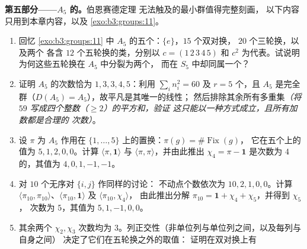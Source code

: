 \begin{problem}
\medskip
\noindent\textbf{第五部分——$A_5$ 的。}伯恩赛德定理
       无法触及的最小群值得完整刻画，
       以下内容只用到本章内容，以及
       \cref{exo:b3:groups:11}。
\begin{enumerate}[resume]
  \item 回忆 \cref{exo:b3:groups:11} 中
        $A_5$ 的五个：$\{e\}$，$15$ 个双对换，
        $20$ 个三轮换，以及两个
        各含 $12$ 个五轮换的类，分别以 $c =
        (1\,2\,3\,4\,5)$ 和 $c^2$ 为代表。试说明
        为何这些五轮换在 $A_5$ 中分裂为两个，
        而在 $S_5$ 中却同属一个？
  \item 证明 $A_5$ 的次数恰为
        $1, 3, 3, 4, 5$：利用 $\sum_in_i^2 = 60$ 及 $r = 5$
        个，且 $A_5$ 是完全群（$D(A_5) =
        A_5$），故平凡是其唯一的线性；
        然后排除其余所有多重集\emph{（将 $59$
        写成四个整数（$\geq 2$）的平方和，验证
        这只能以一种方式成立，且所有加数都是合理的
        次数）}。
  \item 设 $\pi$ 为 $A_5$ 作用在
        $\{1, \dots, 5\}$ 上的置换：$\pi(g) = \#\operatorname{Fix}(g)$，
        它在五个上的值为 $5, 1, 2, 0, 0$。计算
        $\langle\pi, \mathbf 1\rangle$ 与 $\langle\pi,
        \pi\rangle$，并由此推出 $\chi_4 = \pi - \mathbf 1$
        是次数为 $4$ 的，其值为 $4, 0, 1, -1,
        -1$。
  \item 对 $10$ 个无序对 $\{i, j\}$ 作同样的讨论：
        不动点个数依次为 $10, 2, 1, 0, 0$。计算
        $\langle\pi_{10}, \pi_{10}\rangle$、$\langle\pi_{10},
        \mathbf 1\rangle$ 及 $\langle\pi_{10}, \chi_4\rangle$，
        由此推出分解 $\pi_{10} = \mathbf 1 + \chi_4
        + \chi_5$，并得到 $\chi_5$，
        次数为 $5$，其值为 $5, 1, -1, 0, 0$。
  \item 其余两个 $\chi_2, \chi_3$ 次数均为
        $3$。列正交性（非单位列与单位列之间，以及每列与自身之间）
        决定了它们在五轮换之外的取值：
        证明在双对换上有

\end{enumerate}
\end{problem}

